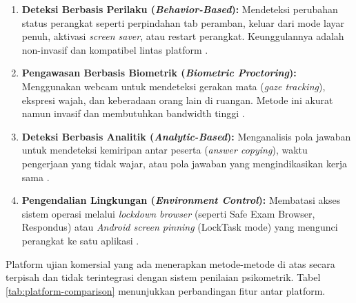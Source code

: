 \begin{enumerate}
	\item \textbf{Deteksi Berbasis Perilaku (\textit{Behavior-Based}):} Mendeteksi perubahan status perangkat seperti perpindahan tab peramban, keluar dari mode layar penuh, aktivasi \textit{screen saver}, atau restart perangkat. Keunggulannya adalah non-invasif dan kompatibel lintas platform \citep{Dawson2017}.

	\item \textbf{Pengawasan Berbasis Biometrik (\textit{Biometric Proctoring}):} Menggunakan webcam untuk mendeteksi gerakan mata (\textit{gaze tracking}), ekspresi wajah, dan keberadaan orang lain di ruangan. Metode ini akurat namun invasif dan membutuhkan bandwidth tinggi \citep{Chuang2020}.

	\item \textbf{Deteksi Berbasis Analitik (\textit{Analytic-Based}):} Menganalisis pola jawaban untuk mendeteksi kemiripan antar peserta (\textit{answer copying}), waktu pengerjaan yang tidak wajar, atau pola jawaban yang mengindikasikan kerja sama \citep{Wollack2003}.

	\item \textbf{Pengendalian Lingkungan (\textit{Environment Control}):} Membatasi akses sistem operasi melalui \textit{lockdown browser} (seperti Safe Exam Browser, Respondus) atau \textit{Android screen pinning} (LockTask mode) yang mengunci perangkat ke satu aplikasi \citep{Franchi2019}.
\end{enumerate}

Platform ujian komersial yang ada menerapkan metode-metode di atas secara terpisah dan tidak terintegrasi dengan sistem penilaian psikometrik. Tabel \ref{tab:platform-comparison} menunjukkan perbandingan fitur antar platform.

